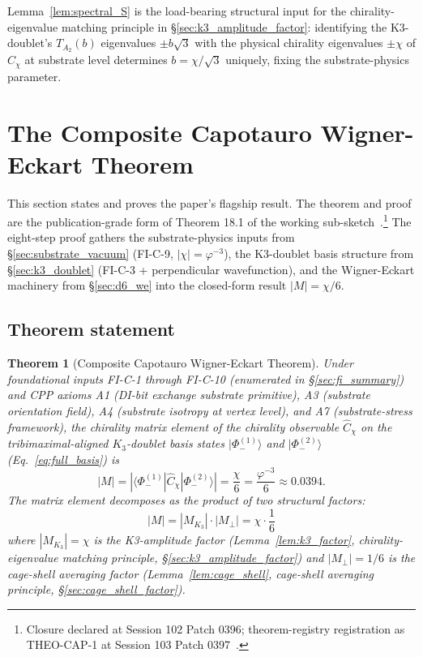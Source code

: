 \documentclass[11pt,letterpaper]{article}
\newtheorem{theorem}{Theorem}[section]
\newcommand{\phig}{\varphi}
\newcommand{\Kthree}{\ensuremath{K_3}}
\newcommand{\Cchi}{\hat{C}_\chi}
\newcommand{\PhiminusOne}{|\Phi_-^{(1)}\rangle}
\newcommand{\PhiminusTwo}{|\Phi_-^{(2)}\rangle}
\begin{document}
Lemma~\ref{lem:spectral_S} is the load-bearing structural input for the chirality-eigenvalue matching principle in \S\ref{sec:k3_amplitude_factor}: identifying the K3-doublet's $T_{A_2}(b)$ eigenvalues $\pm b\sqrt{3}$ with the physical chirality eigenvalues $\pm \chi$ of $\Cchi$ at substrate level determines $b = \chi/\sqrt{3}$ uniquely, fixing the substrate-physics parameter.

\section{The Composite Capotauro Wigner-Eckart Theorem}\label{sec:composite_we}

This section states and proves the paper's flagship result. The theorem and proof are the publication-grade form of Theorem 18.1 of the working sub-sketch~\cite{abshier_capotauro_subclaim_c_sketch}.\footnote{Closure declared at Session 102 Patch 0396; theorem-registry registration as THEO-CAP-1 at Session 103 Patch 0397~\cite{abshier_theorem_registry}.} The eight-step proof gathers the substrate-physics inputs from \S\ref{sec:substrate_vacuum} (FI-C-9, $|\chi| = \phig^{-3}$), the K3-doublet basis structure from \S\ref{sec:k3_doublet} (FI-C-3 + perpendicular wavefunction), and the Wigner-Eckart machinery from \S\ref{sec:d6_we} into the closed-form result $|M| = \chi/6$.

\subsection{Theorem statement}\label{sec:theorem_statement}

\begin{theorem}[Composite Capotauro Wigner-Eckart Theorem]\label{thm:composite_cap_we}
Under foundational inputs FI-C-1 through FI-C-10 (enumerated in \S\ref{sec:fi_summary}) and CPP axioms A1 (DI-bit exchange substrate primitive), A3 (substrate orientation field), A4 (substrate isotropy at vertex level), and A7 (substrate-stress framework), the chirality matrix element of the chirality observable $\Cchi$ on the tribimaximal-aligned $\Kthree$-doublet basis states $\PhiminusOne$ and $\PhiminusTwo$ (Eq.~\eqref{eq:full_basis}) is
\begin{equation}\label{eq:main_result}
\boxed{\;|M| = |\langle \Phi_-^{(1)} | \Cchi | \Phi_-^{(2)} \rangle| = \frac{\chi}{6} = \frac{\phig^{-3}}{6} \approx 0.0394.\;}
\end{equation}
The matrix element decomposes as the product of two structural factors:
\begin{equation}\label{eq:decomposition}
|M| = |M_{\Kthree}| \cdot |M_\perp| = \chi \cdot \frac{1}{6}
\end{equation}
where $|M_{\Kthree}| = \chi$ is the K3-amplitude factor (Lemma~\ref{lem:k3_factor}, chirality-eigenvalue matching principle, \S\ref{sec:k3_amplitude_factor}) and $|M_\perp| = 1/6$ is the cage-shell averaging factor (Lemma~\ref{lem:cage_shell}, cage-shell averaging principle, \S\ref{sec:cage_shell_factor}).
\end{theorem}
\end{document}

